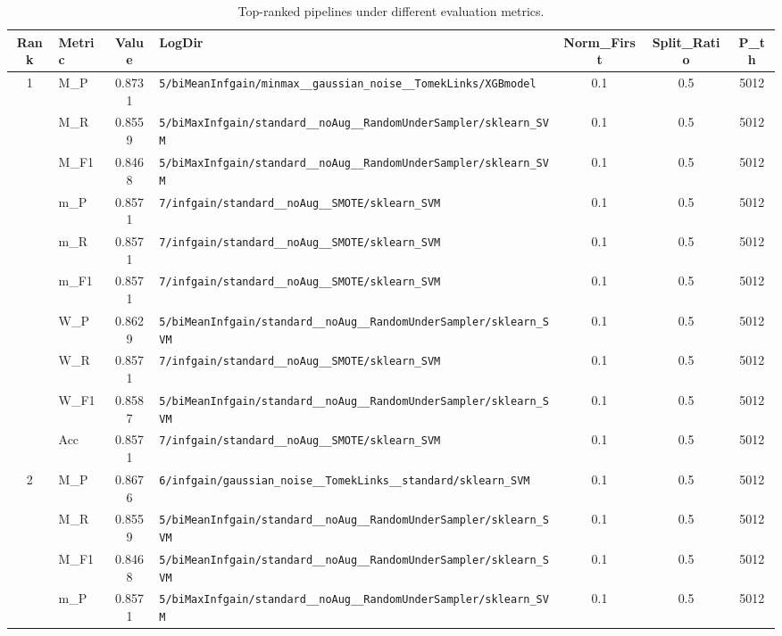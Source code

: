 \begin{table}[htbp]
\caption{Top-ranked pipelines under different evaluation metrics.}
\label{tab:rank_metric_vertical}
\centering
\small
\setlength{\tabcolsep}{4pt}
\begin{tabular}{|c|l|c|>{\ttfamily\footnotesize}p{7.2cm}|c|c|c|}
\hline
Rank & Metric & Value & LogDir & Norm\_First & Split\_Ratio & P\_th \\
\hline
\multirow{10}{*}{1} & M\_P & 0.8731 & \texttt{5/biMeanInfgain/minmax\_\_gaussian\_noise\_\_TomekLinks/XGBmodel} & 0.1 & 0.5  & 5012 \\ 
 & M\_R & 0.8559 & \texttt{5/biMaxInfgain/standard\_\_noAug\_\_RandomUnderSampler/sklearn\_SVM} & 0.1 & 0.5  & 5012 \\ 
 & M\_F1 & 0.8468 & \texttt{5/biMaxInfgain/standard\_\_noAug\_\_RandomUnderSampler/sklearn\_SVM} & 0.1 & 0.5  & 5012 \\ 
 & m\_P & 0.8571 & \texttt{7/infgain/standard\_\_noAug\_\_SMOTE/sklearn\_SVM} & 0.1 & 0.5  & 5012 \\ 
 & m\_R & 0.8571 & \texttt{7/infgain/standard\_\_noAug\_\_SMOTE/sklearn\_SVM} & 0.1 & 0.5  & 5012 \\ 
 & m\_F1 & 0.8571 & \texttt{7/infgain/standard\_\_noAug\_\_SMOTE/sklearn\_SVM} & 0.1 & 0.5  & 5012 \\ 
 & W\_P & 0.8629 & \texttt{5/biMeanInfgain/standard\_\_noAug\_\_RandomUnderSampler/sklearn\_SVM} & 0.1 & 0.5  & 5012 \\ 
 & W\_R & 0.8571 & \texttt{7/infgain/standard\_\_noAug\_\_SMOTE/sklearn\_SVM} & 0.1 & 0.5  & 5012 \\ 
 & W\_F1 & 0.8587 & \texttt{5/biMeanInfgain/standard\_\_noAug\_\_RandomUnderSampler/sklearn\_SVM} & 0.1 & 0.5  & 5012 \\ 
 & Acc & 0.8571 & \texttt{7/infgain/standard\_\_noAug\_\_SMOTE/sklearn\_SVM} & 0.1 & 0.5  & 5012 \\ 
\hline
\multirow{10}{*}{2} & M\_P & 0.8676 & \texttt{6/infgain/gaussian\_noise\_\_TomekLinks\_\_standard/sklearn\_SVM} & 0.1 & 0.5  & 5012 \\ 
 & M\_R & 0.8559 & \texttt{5/biMeanInfgain/standard\_\_noAug\_\_RandomUnderSampler/sklearn\_SVM} & 0.1 & 0.5  & 5012 \\ 
 & M\_F1 & 0.8468 & \texttt{5/biMeanInfgain/standard\_\_noAug\_\_RandomUnderSampler/sklearn\_SVM} & 0.1 & 0.5  & 5012 \\ 
 & m\_P & 0.8571 & \texttt{5/biMaxInfgain/standard\_\_noAug\_\_RandomUnderSampler/sklearn\_SVM} & 0.1 & 0.5  & 5012 \\ 

\end{tabular}
\end{table}
